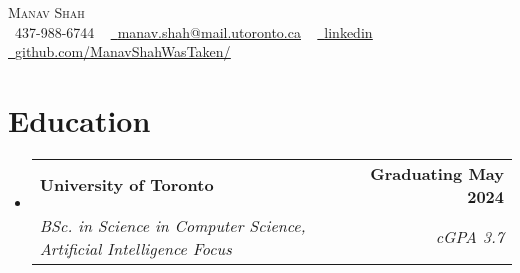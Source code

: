 \documentclass[letterpaper,11pt]{article}
\makeatletter
\newcommand{\resumeSubheading}[4]{
  \vspace{-2pt}\item
    \begin{tabular*}{1.0\textwidth}[t]{l@{\extracolsep{\fill}}r}
      \textbf{#1} & \textbf{\small #2} \\
      \textit{\small#3} & \textit{\small #4} \\
    \end{tabular*}\vspace{-7pt}
}
\newcommand{\resumeSubHeadingListStart}{\begin{itemize}[leftmargin=0.0in, label={}]}
\newcommand{\resumeSubHeadingListEnd}{\end{itemize}}
\makeatother
\begin{document}

\begin{center}
    {\Huge \scshape Manav Shah} \\ \vspace{1pt}
    \small \raisebox{-0.1\height}\faPhone\ 437-988-6744 ~ \href{mailto:manav.shah@mail.utoronto.ca}{\raisebox{-0.2\height}\faEnvelope\  \underline{manav.shah@mail.utoronto.ca}} ~ 
    \href{https://www.linkedin.com/in/manav-shah-88557a1a0/}{\raisebox{-0.2\height}\faLinkedin\ \underline{linkedin}}  ~
    \href{https://github.com/ManavShahWasTaken/}{\raisebox{-0.2\height}\faGithub\ \underline{github.com/ManavShahWasTaken/}}
    \vspace{-8pt}
\end{center}


\section{Education}
  \resumeSubHeadingListStart
    \resumeSubheading
      {University of Toronto}{Graduating May 2024}
      {BSc. in Science in Computer Science, Artificial Intelligence Focus}{cGPA 3.7}
  \resumeSubHeadingListEnd

\end{document}
